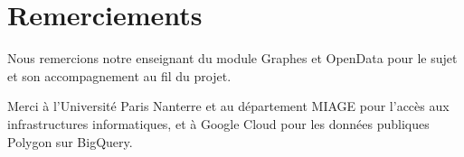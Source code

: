 
\section*{Remerciements}

Nous remercions notre enseignant du module \og Graphes et OpenData \fg{}
pour le sujet et son accompagnement au fil du projet.

Merci \`a l'Universit\'e Paris Nanterre et au d\'epartement MIAGE pour
l'acc\`es aux infrastructures informatiques, et \`a Google Cloud pour les
donn\'ees publiques Polygon sur BigQuery.
